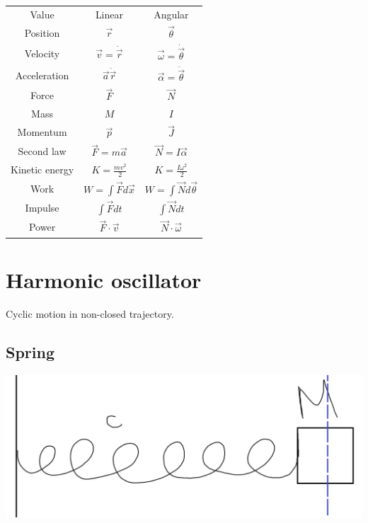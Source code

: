 \begin{center}
	\begin{tabular}{ccc}
		Value &	Linear&Angular \\
		Position&$\vec{r}$ & $\vec{\theta}$\\
		Velocity&$\vec{v} = \dot{\vec{r}}$ & $\vec{\omega}=\dot{\vec{\theta}}$\\
		Acceleration&$\vec{a} \ddot{\vec{r}}$ & $\vec{\alpha}= \ddot{\vec{\theta}}$\\
		Force&$\vec{F}$ & $\vec{N}$\\
		Mass&$M$ & $I$\\
		Momentum&$\vec{p}$ & $\vec{J}$\\
		Second law&$\vec{F} = m \vec{a}$ & $\vec{N} = I \vec{\alpha}$\\
		Kinetic energy&$K=\frac{mv^2}{2}$ & $K=\frac{I\omega^2}{2}$\\
		Work&$W = \int \vec{F} d\vec{x}$ & $W = \int \vec{N} d\vec{\theta}$\\
		Impulse&$\int \vec{F} dt$ & $\int \vec{N} dt$\\
		Power&$\vec{F} \cdot \vec{v}$ & $\vec{N} \cdot \vec{\omega}$
	\end{tabular}
\end{center}

\section{Harmonic oscillator}

Cyclic motion in non-closed trajectory.

\subsection{Spring}


\begin{center}
	\includegraphics[width=\linewidth]{./lect18/pic4.png}
\end{center}


